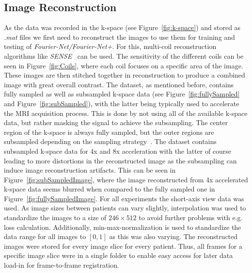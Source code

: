 \documentclass[english,version-2022-01]{uzl-thesis} %
\begin{document}
\subsection{Image Reconstruction} \label{SubSec:ImageReconstruction}
As the data was recorded in the k-space (see Figure~\ref{fig:k-space}) and stored as \emph{.mat} files we first need to reconstruct the images to use them for training and testing of \emph{Fourier-Net/Fourier-Net+}. For this, multi-coil reconstruction algorithms like \emph{SENSE}~\cite{SENSE1} can be used. The sensitivity of the different coils can be seen in Figure~\ref{fig:Coils}, where each coil focuses on a specific area of the image. These images are then stitched together in reconstruction to produce a combined image with great overall contrast.
The dataset, as mentioned before, contains fully sampled as well as subsampled k-space data (see Figure~\ref{fig:fullySampled} and Figure~\ref{fig:subSampled}), with the latter being typically used to accelerate the MRI acquisition process. This is done by not using all of the available k-space data, but rather masking the signal to achieve the subsampling. The center region of the k-space is always fully sampled, but the outer regions are subsampled depending on the sampling strategy~\cite{SamplingStrategies}. The dataset contains subsampled k-space data for 4x and 8x acceleration with the latter of course leading to more distortions in the reconstructed image as the subsampling can induce image reconstruction artifacts. This can be seen in Figure~\ref{fig:subSampledImage}, where the image reconstructed from 4x accelerated k-space data seems blurred when compared to the fully sampled one in Figure~\ref{fig:fullySampledImage}. 
For all experiments the short-axis  view data was used. As image sizes between patients can vary slightly, interpolation was used to standardize the images to a size of $246 \times 512$ to avoid further problems with e.g. 
loss calculation. Additionally, min-max-normalization is used to standardize the data range for all images to $[0,1]$ as this was also varying. The reconstructed images were stored for every image slice for every patient. Thus, all frames for a specific image slice were in a single folder to enable easy access for later data load-in for frame-to-frame registration.
\end{document}
